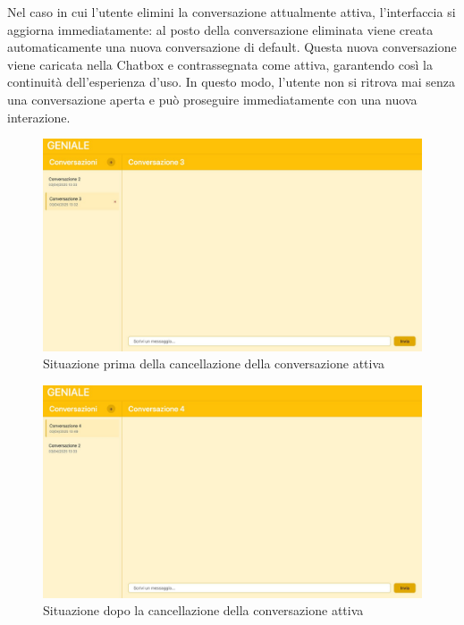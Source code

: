 Nel caso in cui l’utente elimini la conversazione attualmente attiva, l’interfaccia si aggiorna immediatamente: al posto della conversazione eliminata viene creata automaticamente una nuova conversazione di default. Questa nuova conversazione viene caricata nella Chatbox e contrassegnata come attiva, garantendo così la continuità dell’esperienza d’uso. In questo modo, l’utente non si ritrova mai senza una conversazione aperta e può proseguire immediatamente con una nuova interazione.
\begin{figure}[H]
\centering
\includegraphics[width=1\textwidth]{contents/img/rm_conv_active_before.jpg}
\caption{Situazione prima della cancellazione della conversazione attiva}
\end{figure}
\begin{figure}[H]
\centering
\includegraphics[width=1\textwidth]{contents/img/rm_conv_active_after.jpg}
\caption{Situazione dopo la cancellazione della conversazione attiva}
\end{figure}

